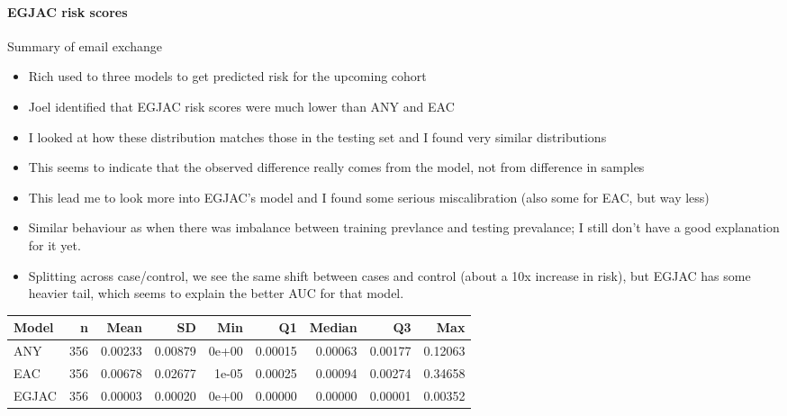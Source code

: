 \documentclass[12pt]{article}
\begin{document}
\clearpage

\paragraph*{EGJAC risk scores}
Summary of email exchange
\begin{itemize}
	\item Rich used to three models to get predicted risk for the upcoming cohort
	\item Joel identified that EGJAC risk scores were much lower than ANY and EAC 
	\item I looked at how these distribution matches those in the testing set and I found very similar distributions
	\item This seems to indicate that the observed difference really comes from the model, not from difference in samples
	\item This lead me to look more into EGJAC's model and I found some serious miscalibration (also some for EAC, but way less)
	\item Similar behaviour as when there was imbalance between training prevlance and testing prevalance; I still don't have a good explanation for it yet.
	\item Splitting across case/control, we see the same shift between cases and control (about a 10x increase in risk), but EGJAC has some heavier tail, which seems to explain the better AUC for that model.
\end{itemize}

\begin{table}[ht]
\centering
\begin{tabular}{lrrrrrrrr}
\toprule
Model 	&n 		&Mean 		&SD 			&Min 	&Q1 			&Median 		&Q3 			&Max\\ \midrule
ANY 		&356 	&0.00233 	&0.00879 	&0e+00 	&0.00015 	&0.00063 	&0.00177 	&0.12063\\
EAC 		&356 	&0.00678 	&0.02677 	&1e-05 	&0.00025 	&0.00094 	&0.00274 	&0.34658\\
EGJAC 	&356 	&0.00003 	&0.00020 	&0e+00 	&0.00000 	&0.00000 	&0.00001 	&0.00352\\ \bottomrule
\end{tabular}
\end{table}
\end{document}
